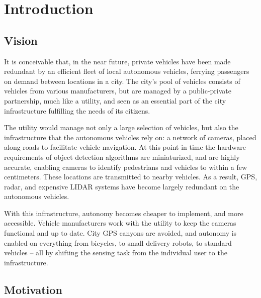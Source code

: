 \documentclass[a4paper,12pt,twoside,openright]{report}
\begin{document}
\pagestyle{empty}
\singlespacing

\onehalfspacing

\singlespacing


\setcounter{page}{0}
\pagestyle{plain}
\tableofcontents
\listoffigures
\listoftables

\onehalfspacing


\chapter{Introduction}
\setcounter{page}{1} 

\section{Vision}

It is conceivable that, in the near future, private vehicles have been made redundant by an efficient
fleet of local autonomous vehicles, ferrying passengers on demand between locations in 
a city. The city's pool of vehicles consists of vehicles from various manufacturers, 
but are managed by a public-private partnership, much like a utility, and 
seen as an essential part of the city infrastructure fulfilling the needs of its citizens.

The utility would manage not only a large selection of vehicles, but also the infrastructure 
that the autonomous vehicles rely on: a network of cameras, placed along roads to 
facilitate vehicle navigation. At this point in time the hardware requirements of
object detection algorithms are miniaturized, and are highly accurate, enabling cameras
to identify pedestrians and vehicles to within a few centimeters. These locations are
transmitted to nearby vehicles. As a result, GPS, radar, and expensive LIDAR systems
have become largely redundant on the autonomous vehicles.

With this infrastructure, autonomy becomes cheaper to implement,
and more accessible. Vehicle manufacturers work with the utility to keep the cameras 
functional and up to date. City GPS canyons are avoided, and autonomy is enabled 
on everything from bicycles, to small delivery robots, to standard vehicles -- all by 
shifting the sensing task from the individual user to the infrastructure.

\section{Motivation}
\end{document}
